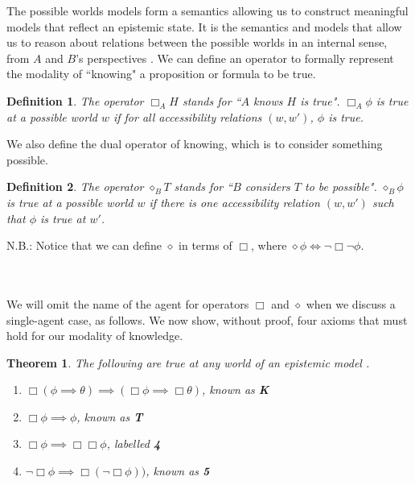 \documentclass[12pt, a4paper, titlepage]{scrartcl}
\newtheorem{defn}{Definition}
\newtheorem{thm}{Theorem}
\begin{document}
The possible worlds models form a semantics allowing us to construct meaningful
models that reflect an epistemic state.
It is the semantics and models that allow us to reason about relations between the possible worlds in
an internal sense, from $A$ and $B$'s perspectives \cite{blackburn2002modal}.
We can define an operator to formally represent the modality of ``knowing"
a proposition or formula to be true.
\begin{defn}
	The operator $\Box_A H$ stands for ``$A$ knows $H$ is true".
	$\Box_A \phi$ is true at a possible world $w$ if for all accessibility relations $(w,
	w')$, $\phi$ is true.
\end{defn}
We also define the dual operator of knowing, which is to consider something
possible.
\begin{defn}
	The operator $\diamond_B T$ stands for ``$B$ considers $T$ to be possible".
	$\diamond_B \phi$ is true at a possible world $w$ if there is one
	accessibility relation $(w,w')$ such that $\phi$ is true at $w'$.\\
	
\end{defn}
\begin{note}
	N.B.: Notice that we can define $\diamond$ in terms of $\Box$, where $\diamond
	\phi \iff \neg \Box \neg \phi$.
\end{note}\\
\\
We will omit the name of the agent for operators $\Box$ and $\diamond$ when we
discuss a single-agent case, as follows.
We now show, without proof, four axioms that must hold for our modality of
knowledge.
\begin{thm}
	The following are true at any world of an epistemic model
	\cite{hoek2008dynamic}.
	\begin{enumerate}
		\item $\Box (\phi \implies \theta) \implies (\Box \phi \implies \Box
				\theta)$, known as {\bf K}
		\item $\Box \phi \implies \phi$, known as {\bf T}
		\item $\Box \phi \implies \Box \Box \phi$, labelled {\bf 4}
		\item $\neg \Box \phi \implies \Box (\neg \Box \phi))$, known as {\bf 5}
	\end{enumerate}
\end{thm}
\end{document}
